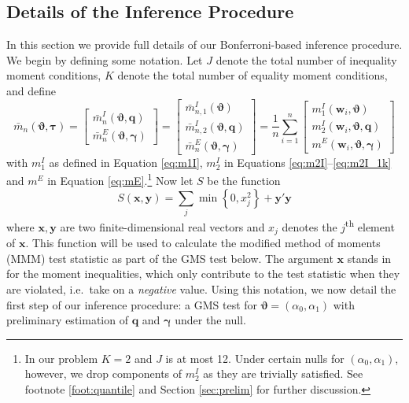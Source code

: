\subsection{Details of the Inference Procedure}
\label{sec:details}
In this section we provide full details of our Bonferroni-based inference procedure.
We begin by defining some notation.
Let $J$ denote the total number of inequality moment conditions, $K$ denote the total number of equality moment conditions, and define
\begin{equation}
\bar{m}_n(\boldsymbol{\vartheta}, \boldsymbol{\tau}) = \left[
\begin{array}{c}
  \bar{m}_n^I(\boldsymbol{\vartheta}, \mathbf{q}) \\
  \bar{m}_n^E(\boldsymbol{\vartheta}, \boldsymbol{\gamma}) 
\end{array}
\right] = 
\left[
\begin{array}{l}
  \bar{m}_{n,1}^I(\boldsymbol{\vartheta})\\
  \bar{m}_{n,2}^I(\boldsymbol{\vartheta}, \mathbf{q}) \\
  \bar{m}_n^E(\boldsymbol{\vartheta}, \boldsymbol{\gamma}) 
\end{array}
\right] = 
\frac{1}{n} \sum_{i=1}^n
\left[\begin{array}{l}
    m^I_1(\mathbf{w}_i,\boldsymbol{\vartheta})\\
    m^I_2(\mathbf{w}_i,\boldsymbol{\vartheta}, \mathbf{q}) \\
    m^E(\mathbf{w}_i,\boldsymbol{\vartheta}, \boldsymbol{\gamma}) 
\end{array}\right]
\label{eq:mbar_def}
\end{equation}
with $m_1^I$ as defined in Equation \ref{eq:m1I}, $m_2^I$ in Equations \ref{eq:m2I}--\ref{eq:m2I_1k} and $m^E$ in Equation \ref{eq:mE}.\footnote{In our problem $K=2$ and $J$ is at most 12. Under certain nulls for $(\alpha_0, \alpha_1)$, however, we drop components of $m^I_2$ as they are trivially satisfied. See footnote \ref{foot:quantile} and Section \ref{sec:prelim} for further discussion.}
Now let $S$ be the function
\begin{equation}
  S(\mathbf{x}, \mathbf{y}) = \sum_{j}\min\left\{ 0, 
  x_j^2 \right\} + \mathbf{y}'\mathbf{y} 
    \label{eq:MMM}
\end{equation}
where $\mathbf{x}, \mathbf{y}$ are two finite-dimensional real vectors and $x_j$ denotes the $j$\textsuperscript{th} element of $\mathbf{x}$.
This function will be used to calculate the modified method of moments (MMM) test statistic as part of the GMS test below.
The argument $\mathbf{x}$ stands in for the moment inequalities, which only contribute to the test statistic when they are violated, i.e.\ take on a \emph{negative} value.
Using this notation, we now detail the first step of our inference procedure: a GMS test for $\boldsymbol{\vartheta} = (\alpha_0, \alpha_1)$ with preliminary estimation of $\mathbf{q}$ and $\boldsymbol{\gamma}$ under the null.


